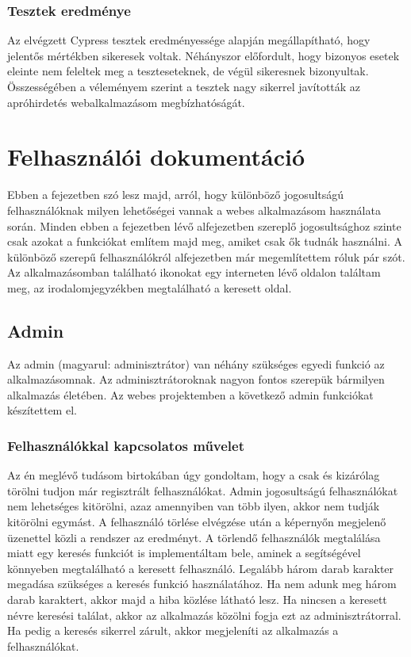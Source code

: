\documentclass[]{thesis-ekf}
\theoremstyle{definition}
\theoremstyle{remark}
\begin{document}
	\subsection{Tesztek eredménye}
		Az elvégzett Cypress tesztek eredményessége alapján megállapítható, hogy jelentős mértékben sikeresek voltak. Néhányszor előfordult, hogy bizonyos esetek eleinte nem feleltek meg a teszteseteknek, de végül sikeresnek bizonyultak. Összességében a véleményem szerint a tesztek nagy sikerrel javították az apróhirdetés webalkalmazásom megbízhatóságát.   
		
	\chapter{Felhasználói dokumentáció}\label{ch-felhasznaloi}
		Ebben a fejezetben szó lesz majd, arról, hogy különböző jogosultságú felhasználóknak milyen lehetőségei vannak a webes alkalmazásom használata során. Minden ebben a fejezetben lévő alfejezetben szereplő jogosultsághoz szinte csak azokat a funkciókat említem majd meg, amiket csak ők tudnák használni. A különböző szerepű felhasználókról \az{\ref{sc-plantuml}} alfejezetben már megemlítettem róluk pár szót. Az alkalmazásomban található ikonokat egy interneten lévő oldalon találtam meg, az irodalomjegyzékben megtalálható a keresett oldal.\cite{Ikon} 
	\section{Admin}
		Az admin (magyarul: adminisztrátor) van néhány szükséges egyedi funkció az alkalmazásomnak. Az adminisztrátoroknak nagyon fontos szerepük bármilyen alkalmazás életében. Az webes projektemben a következő admin funkciókat készítettem el.
	\subsection{Felhasználókkal kapcsolatos művelet}
		Az én meglévő tudásom birtokában úgy gondoltam, hogy a csak és kizárólag törölni tudjon már regisztrált felhasználókat. Admin jogosultságú felhasználókat nem lehetséges kitörölni, azaz amennyiben van több ilyen, akkor nem tudják kitörölni egymást. A felhasználó törlése elvégzése után a képernyőn megjelenő üzenettel közli a rendszer az eredményt. A törlendő felhasználók megtalálása miatt egy keresés funkciót is implementáltam bele, aminek a segítségével könnyeben megtalálható a keresett felhasználó. Legalább három darab karakter megadása szükséges a keresés funkció használatához. Ha nem adunk meg három darab karaktert, akkor majd a hiba közlése látható lesz. Ha nincsen a keresett névre keresési találat, akkor az alkalmazás közölni fogja ezt az adminisztrátorral. Ha pedig a keresés sikerrel zárult, akkor megjeleníti az alkalmazás a felhasználókat.
\end{document}
